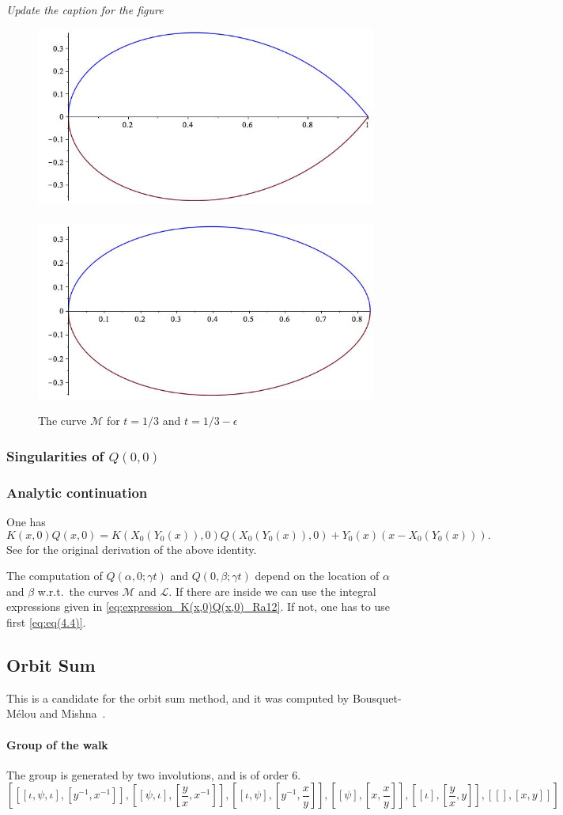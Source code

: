 \documentclass[11pt]{article}
\newcommand\mjm[1]{\mbox{}
{\marginpar{\color{red!50}$\EuScript{M}$}}
{\it\noindent\color{red!50}#1}}%
\begin{document}
\mjm{Update the caption for the figure}
\begin{figure}\center
\includegraphics[width=.3\textwidth]{curveX-singular.jpg}$\quad$
\includegraphics[width=.3\textwidth]{curveX.jpg}
\caption{The curve $\mathcal M$ for $t=1/3$ and $t=1/3-\epsilon$}
\end{figure}

\subsubsection{Singularities of $Q(0,0)$}


\subsubsection{Analytic continuation}

One has
\begin{equation}
\label{eq:eq(4.4)}
     K(x,0)Q(x,0)=K(X_0(Y_0(x)),0)Q(X_0(Y_0(x)),0)+Y_0(x)(x-X_0(Y_0(x))).
\end{equation}
See \cite[Equation (4.4)]{FaRa-12} for the original derivation of the above identity.

The computation of $Q(\alpha,0;\gamma t)$ and $Q(0,\beta;\gamma t)$
depend on the location of $\alpha$ and $\beta$ w.r.t.\ the curves
$\mathcal M$ and $\mathcal L$. If there are inside we can use the
integral expressions given in
\eqref{eq:expression_K(x,0)Q(x,0)_Ra12}. If not, one has to use first
\eqref{eq:eq(4.4)}.

\subsection{Orbit Sum}
This is a candidate for the orbit sum method, and it was computed by
Bousquet-M\'elou and Mishna~\cite{BoMi10}.

\paragraph{Group of the walk}
The group is generated by two involutions, and is of order 6.
\[[[[\iota,\psi,\iota],[{y}^{-1},{x}^{-1}]],[[\psi,\iota],[{\frac {y}{x}
},{x}^{-1}]],[[\iota,\psi],[{y}^{-1},{\frac {x}{y}}]],[[\psi],[x,{
\frac {x}{y}}]],[[\iota],[{\frac {y}{x}},y]],[[],[x,y]]]\]
\end{document}
